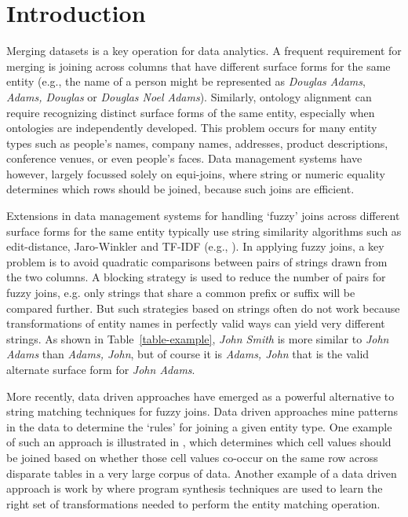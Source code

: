 \section{Introduction}

Merging datasets is a key operation for data analytics.  A frequent
requirement for merging is joining across columns that have
different surface forms for the same entity (e.g., the name of a
person might be represented as \textit{Douglas Adams},
\textit{Adams, Douglas} or \textit{Douglas Noel Adams}).  Similarly,
ontology alignment can require recognizing distinct surface forms of
the same entity, especially when ontologies are independently
developed.  This problem occurs for many entity types such as people's names, company names, addresses, product descriptions, conference venues, or even people's faces.  Data management systems have however, largely focussed solely on equi-joins, where string or numeric equality determines which rows should be joined, because such joins are efficient.

Extensions in data management systems for handling `fuzzy' joins across different surface forms for the same entity typically use string similarity algorithms such as edit-distance, Jaro-Winkler and TF-IDF (e.g., \cite{Cohen2003}).  In applying fuzzy joins, a key problem is to avoid quadratic comparisons between pairs of strings drawn from the two columns.  A blocking strategy is used to reduce the number of pairs for fuzzy joins, e.g. only strings that share a common prefix or suffix will be compared further.  But such strategies based on strings often do not work because transformations of entity names in perfectly valid ways can yield very different strings.  As shown in Table~\ref{table-example}, \textit{John Smith} is more similar to \textit{John Adams} than \textit{Adams, John}, but of course it is \textit{Adams, John} that is the valid alternate surface form for \textit{John Adams}.

More recently, data driven approaches have emerged as a powerful alternative to string matching techniques for fuzzy joins.  Data driven approaches mine patterns in the data to determine the `rules' for joining a given entity type.  One example of such an approach is illustrated in \cite{He:2015:SJS:2824032.2824036}, which determines which cell values should be joined based on whether those cell values co-occur on the same row across disparate tables in a very large corpus of data.  Another example of a data driven approach is work by \cite{auto-join-joining-tables-leveraging-transformations} where program synthesis techniques are used to learn the right set of transformations needed to perform the entity matching operation.  

